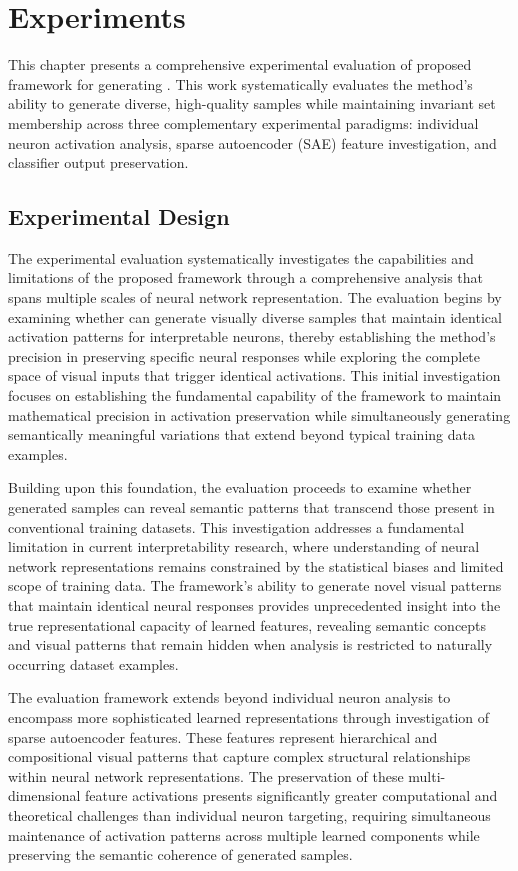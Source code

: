 \chapter{Experiments}\label{r:experiments}

This chapter presents a comprehensive experimental evaluation of proposed \method{} framework for generating \framework{}. This work systematically evaluates the method's ability to generate diverse, high-quality samples while maintaining invariant set membership across three complementary experimental paradigms: individual neuron activation analysis, sparse autoencoder (SAE) feature investigation, and classifier output preservation.

\section{Experimental Design}

The experimental evaluation systematically investigates the capabilities and limitations of the proposed framework through a comprehensive analysis that spans multiple scales of neural network representation. The evaluation begins by examining whether \method{} can generate visually diverse samples that maintain identical activation patterns for interpretable neurons, thereby establishing the method's precision in preserving specific neural responses while exploring the complete space of visual inputs that trigger identical activations. This initial investigation focuses on establishing the fundamental capability of the framework to maintain mathematical precision in activation preservation while simultaneously generating semantically meaningful variations that extend beyond typical training data examples.

Building upon this foundation, the evaluation proceeds to examine whether generated samples can reveal semantic patterns that transcend those present in conventional training datasets. This investigation addresses a fundamental limitation in current interpretability research, where understanding of neural network representations remains constrained by the statistical biases and limited scope of training data. The framework's ability to generate novel visual patterns that maintain identical neural responses provides unprecedented insight into the true representational capacity of learned features, revealing semantic concepts and visual patterns that remain hidden when analysis is restricted to naturally occurring dataset examples.

The evaluation framework extends beyond individual neuron analysis to encompass more sophisticated learned representations through investigation of sparse autoencoder features. These features represent hierarchical and compositional visual patterns that capture complex structural relationships within neural network representations. The preservation of these multi-dimensional feature activations presents significantly greater computational and theoretical challenges than individual neuron targeting, requiring simultaneous maintenance of activation patterns across multiple learned components while preserving the semantic coherence of generated samples.

